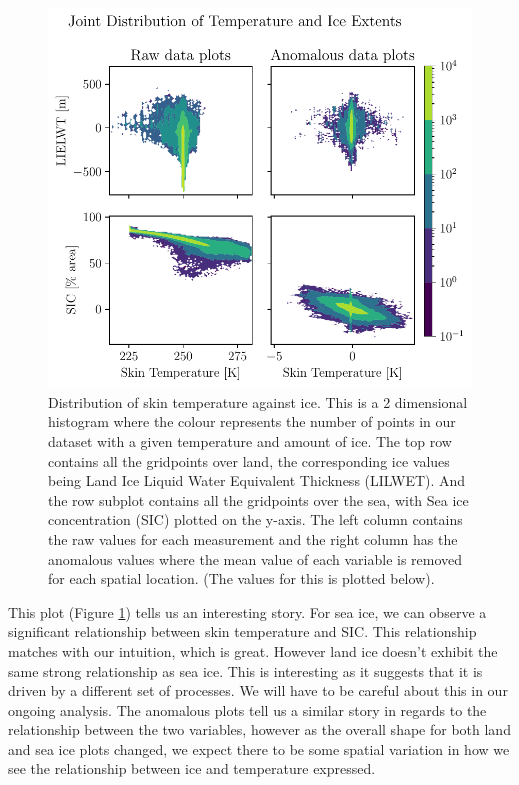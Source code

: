\documentclass[../main.tex]{subfiles}
\begin{document}
\begin{figure}[h!]
    \centering
    \includegraphics{images/week8/hres/distribution_of_temperature_ice_both_raw_and_anomalous.pdf}
    \caption{Distribution of skin temperature against ice. This is a 2 dimensional histogram where the colour represents the number of points in our dataset with a given temperature and amount of ice. The top row contains all the gridpoints over land, the corresponding ice values being Land Ice Liquid Water Equivalent Thickness (LILWET). And the row subplot contains all the gridpoints over the sea, with Sea ice concentration (SIC) plotted on the y-axis. The left column contains the raw values for each measurement and the right column has the anomalous values where the mean value of each variable is removed for each spatial location. (The values for this is plotted below).}
    \label{fig:joint_distribuition_temp_ice}
\end{figure}

This plot (Figure \ref{fig:joint_distribuition_temp_ice}) tells us an interesting story. For sea ice, we can observe a significant relationship between skin temperature and SIC. This relationship matches with our intuition, which is great. However land ice doesn't exhibit the same strong relationship as sea ice. This is interesting as it suggests that it is driven by a different set of processes. We will have to be careful about this in our ongoing analysis. The anomalous plots tell us a similar story in regards to the relationship between the two variables, however as the overall shape for both land and sea ice plots changed, we expect there to be some spatial variation in how we see the relationship between ice and temperature expressed.
\end{document}
